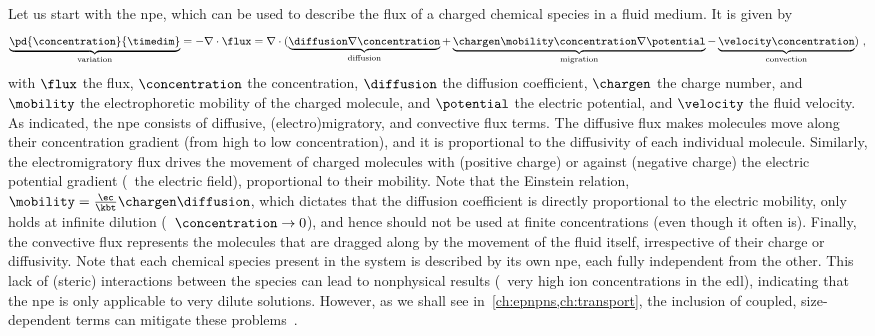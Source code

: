 Let us start with the \gls{npe}, which can be used to describe the flux of a charged chemical species in a
fluid medium. It is given by~\cite{Lu-2011}
%
\begin{equation}\label{eq:nanopores_nernst_planck}
  \underbrace{ \pd{\concentration}{\timedim} }_{\text{variation}}
  = - \nabla \cdot \flux = \nabla \cdot (
    \underbrace{ \diffusion \nabla \concentration }_{\text{diffusion}}
    +
    \underbrace { \chargen \mobility \concentration \nabla \potential }_{\text{migration}}
    -
    \underbrace{\velocity \concentration}_{\text{convection}}
    )
  \text{ ,}
\end{equation}
%
with $\flux$ the flux, $\concentration$ the concentration, $\diffusion$ the diffusion coefficient, $\chargen$
the charge number, and $\mobility$ the electrophoretic mobility of the charged molecule, and $\potential$ the
electric potential, and $\velocity$ the fluid velocity. As indicated, the \gls{npe} consists of
diffusive, (electro)migratory, and convective flux terms. The diffusive flux makes molecules move along their
concentration gradient (from high to low concentration), and it is proportional to the diffusivity of each
individual molecule. Similarly, the electromigratory flux drives the movement of charged molecules with
(positive charge) or against (negative charge) the electric potential gradient (\ie~the electric field),
proportional to their mobility. Note that the Einstein relation,
$\mobility=\frac{\ec}{\kbt}\chargen\diffusion$, which dictates that the diffusion coefficient is
directly proportional to the electric mobility, only holds at infinite dilution (\ie~$\concentration \to 0$),
and hence should not be used at finite concentrations (even though it often is). Finally, the convective flux
represents the molecules that are dragged along by the movement of the fluid itself, irrespective of their
charge or diffusivity. Note that each chemical species present in the system is described by its own
\gls{npe}, each fully independent from the other. This lack of (steric) interactions between the species can
lead to nonphysical results (\ie~very high ion concentrations in the \gls{edl}), indicating that the \gls{npe}
is only applicable to very dilute solutions. However, as we shall see in~\cref{ch:epnpns,ch:transport}, the
inclusion of coupled, size-dependent terms can mitigate these problems~\cite{Lu-2011}.

